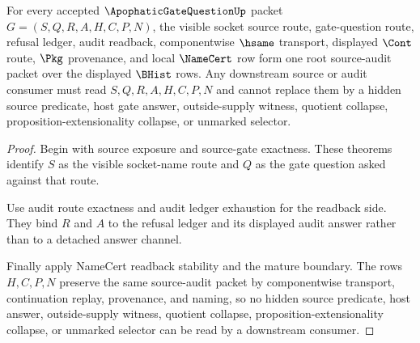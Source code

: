 \begin{theorem}
\label{thm:apophatic-gate-question-root-source-audit-totality}
For every accepted $\ApophaticGateQuestionUp$ packet $G=(S,Q,R,A,H,C,P,N)$, the visible socket source route, gate-question route, refusal ledger, audit readback, componentwise $\hsame$ transport, displayed $\Cont$ route, $\Pkg$ provenance, and local $\NameCert$ row form one root source-audit packet over the displayed $\BHist$ rows. Any downstream source or audit consumer must read $S,Q,R,A,H,C,P,N$ and cannot replace them by a hidden source predicate, host gate answer, outside-supply witness, quotient collapse, proposition-extensionality collapse, or unmarked selector.
\end{theorem}
\begin{proof}
Begin with source exposure and source-gate exactness. These theorems identify $S$ as the visible socket-name route and $Q$ as the gate question asked against that route.

Use audit route exactness and audit ledger exhaustion for the readback side. They bind $R$ and $A$ to the refusal ledger and its displayed audit answer rather than to a detached answer channel.

Finally apply NameCert readback stability and the mature boundary. The rows $H,C,P,N$ preserve the same source-audit packet by componentwise transport, continuation replay, provenance, and naming, so no hidden source predicate, host answer, outside-supply witness, quotient collapse, proposition-extensionality collapse, or unmarked selector can be read by a downstream consumer.
\end{proof}


